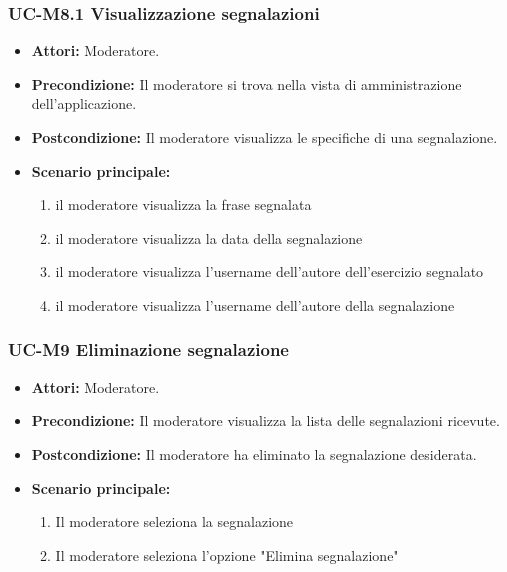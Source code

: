 \subsubsection{UC-M8.1 Visualizzazione segnalazioni}
\begin{itemize}
	\item \textbf{Attori:} Moderatore.
	\item \textbf{Precondizione:} Il moderatore si trova nella vista di amministrazione dell'applicazione.
	\item \textbf{Postcondizione:} Il moderatore visualizza le specifiche di una segnalazione.
	\item \textbf{Scenario principale:}
	\begin{enumerate}
		\item il moderatore visualizza la frase segnalata
		\item il moderatore visualizza la data della segnalazione
		\item il moderatore visualizza l'username dell'autore dell'esercizio segnalato
		\item il moderatore visualizza l'username dell'autore della segnalazione
	\end{enumerate}
\end{itemize}

\subsubsection{UC-M9 Eliminazione segnalazione}
\begin{itemize}
	\item \textbf{Attori:} Moderatore.
	\item \textbf{Precondizione:} Il moderatore visualizza la lista delle segnalazioni ricevute.
	\item \textbf{Postcondizione:} Il moderatore ha eliminato la segnalazione desiderata.
	\item \textbf{Scenario principale:}
	\begin{enumerate}
		\item Il moderatore seleziona la segnalazione
		\item Il moderatore seleziona l'opzione "Elimina segnalazione"
	\end{enumerate}
\end{itemize}

